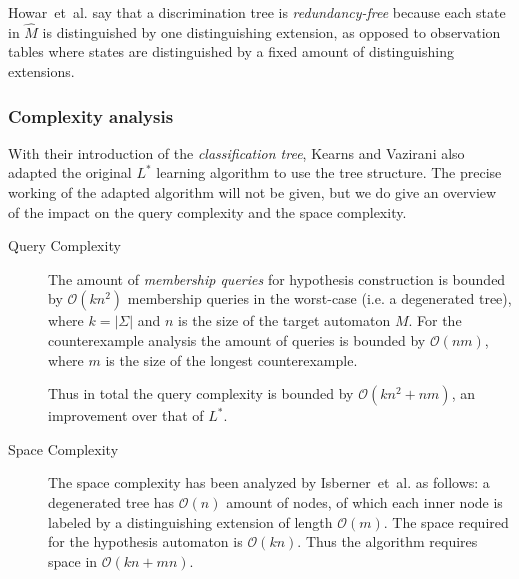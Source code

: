 \documentclass[multi,crop=false,class=article]{standalone}
\begin{document}
Howar~et~al. say that a discrimination tree is \textit{redundancy-free} because
each state in $\hat M$ is distinguished by one distinguishing extension, as
opposed to observation tables where states are distinguished by a fixed amount
of distinguishing extensions\cite{Howar14}.

\subsubsection{Complexity analysis}
\label{sec:complexity-analysis}
With their introduction of the \textit{classification tree}, Kearns and Vazirani
also adapted the original $L^*$ learning algorithm to use the tree
structure\cite{Kearns94}. The precise working of the adapted algorithm will not
be given, but we do give an overview of the impact on the query complexity and
the space complexity.

\begin{description}
\item[Query Complexity] The amount of \textit{membership queries} for hypothesis
  construction is bounded by $\mathcal{O}(kn^2)$ membership queries in the
  worst-case (i.e. a degenerated tree)\cite{Howar14,Kearns94,Isberner14b}, where
  $k = |\Sigma |$ and $n$ is the size of the target automaton $M$. For the
  counterexample analysis the amount of queries is bounded by $\mathcal{O}(nm)$,
  where $m$ is the size of the longest counterexample\cite{Kearns94}.

  Thus in total the query complexity is bounded by $\mathcal{O}(kn^2 + nm)$, an
  improvement over that of $L^*$.
\item[Space Complexity] The space complexity has been analyzed by
  Isberner~et~al. as follows: a degenerated tree has $\mathcal{O}(n)$ amount of
  nodes, of which each inner node is labeled by a distinguishing extension of
  length $\mathcal{O}(m)$\cite{Isberner15}.  The space required for the
  hypothesis automaton is $\mathcal{O}(kn)$\cite{Isberner15}. Thus the algorithm
  requires space in
  $\mathcal{O}(kn + mn)$\cite{Isberner14b,Isberner15}.
\end{description}
\end{document}
